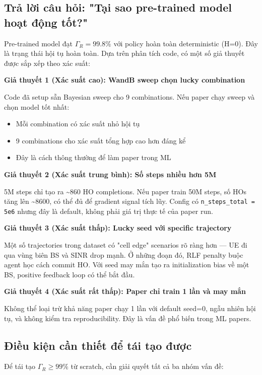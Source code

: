 \documentclass[11pt]{article}
\begin{document}
\subsection{Trả lời câu hỏi: "Tại sao pre-trained model hoạt động tốt?"}

Pre-trained model đạt $\Gamma_R = 99.8\%$ với policy hoàn toàn deterministic (H=0). Đây là trạng thái hội tụ hoàn toàn. Dựa trên phân tích code, có một số giả thuyết được sắp xếp theo xác suất:

\textbf{Giả thuyết 1 (Xác suất cao): WandB sweep chọn lucky combination}

Code đã setup sẵn Bayesian sweep cho 9 combinations. Nếu paper chạy sweep và chọn model tốt nhất:
\begin{itemize}
  \item Mỗi combination có xác suất nhỏ hội tụ
  \item 9 combinations cho xác suất tổng hợp cao hơn đáng kể
  \item Đây là cách thông thường để làm paper trong ML
\end{itemize}

\textbf{Giả thuyết 2 (Xác suất trung bình): Số steps nhiều hơn 5M}

5M steps chỉ tạo ra \textasciitilde 860 HO completions. Nếu paper train 50M steps, số HOs tăng lên \textasciitilde 8600, có thể đủ để gradient signal tích lũy. Config có \texttt{n\_steps\_total = 5e6} nhưng đây là default, không phải giá trị thực tế của paper run.

\textbf{Giả thuyết 3 (Xác suất thấp): Lucky seed với specific trajectory}

Một số trajectories trong dataset có "cell edge" scenarios rõ ràng hơn --- UE đi qua vùng biên BS và SINR drop mạnh. Ở những đoạn đó, RLF penalty buộc agent học cách commit HO. Với seed may mắn tạo ra initialization bias về một BS, positive feedback loop có thể bắt đầu.

\textbf{Giả thuyết 4 (Xác suất rất thấp): Paper chỉ train 1 lần và may mắn}

Không thể loại trừ khả năng paper chạy 1 lần với default seed=0, ngẫu nhiên hội tụ, và không kiểm tra reproducibility. Đây là vấn đề phổ biến trong ML papers.

\subsection{Điều kiện cần thiết để tái tạo được}

Để tái tạo $\Gamma_R \geq 99\%$ từ scratch, cần giải quyết tất cả ba nhóm vấn đề:
\end{document}
